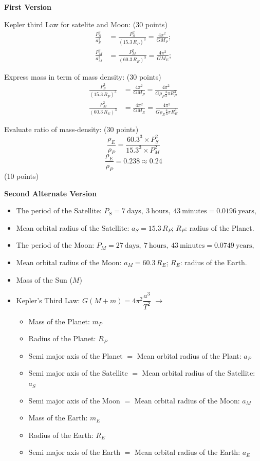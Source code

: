 \textbf{First Version}

Kepler third Law for satelite %
and Moon: \hfill(30 points)
\begin{align*}
  \frac{P_S^2}{a_S^3} &= \frac{P_S^2}{(15.3\,R_P)^3} = \frac{4\pi^2}{GM_P}; \\
  \frac{P_M^2}{a_M^3} &= \frac{P_M^2}{(60.3\,R_E)^3} = \frac{4\pi^2}{GM_E};
\end{align*}

Express mass in term of mass density: \hfill(30 points)
\begin{align*}
  \frac{P_S^2}{(15.3\,R_P)^3} &= \frac{4\pi^2}{GM_P}
    = \frac{4\pi^2}{G\rho_P \frac{4}{3}\pi R_P^3} \\
  \frac{P_M^2}{(60.3\,R_E)^3} &= \frac{4\pi^2}{GM_E}
    = \frac{4\pi^2}{G\rho_E \frac{4}{3}\pi R_E^3}
\end{align*}

Evaluate ratio of mass-density: \hfill(30 points)
\[ \frac{\rho_E}{\rho_P}
   = \frac{60.3^3 \times P_S^2}{15.3^3 \times P_M^2} \]
\[ \frac{\rho_E}{\rho_P} = 0.238 \approx 0.24 \]
\hfill(10 points)

\textbf{Second Alternate Version}

\begin{itemize}
\item The period of the Satellite:
  $P_S = 7\ \text{days},\ 3\ \text{hours},\ 43\ \text{minutes}
   = 0.0196\ \text{years}$,
\item Mean orbital radius of the Satellite: $a_S = 15.3\,R_P$; $R_P$: radius
  of the Planet.
\item The period of the Moon:
  $P_M = 27\ \text{days},\ 7\ \text{hours},\ 43\ \text{minutes}
   = 0.0749\ \text{years}$,
\item Mean orbital radius of the Moon: $a_M = 60.3\,R_E$; $R_E$: radius of
  the Earth.
\item Mass of the Sun ($M$)
\item Kepler's Third Law: $G(M + m) = 4\pi^2 \dfrac{a^3}{T^2}$
  $\rightarrow$
  \begin{itemize}
  \item Mass of the Planet: $m_P$
  \item Radius of the Planet: $R_P$
  \item Semi major axis of the Planet $=$ Mean orbital radius of the
    Plant: %
    $a_P$
  \item Semi major axis of the Satellite $=$ Mean orbital radius of the
    Satellite: $a_S$
  \item Semi major axis of the Moon $=$ Mean orbital radius of the Moon:
    $a_M$
  \item Mass of the Earth: $m_E$
  \item Radius of the Earth: $R_E$
  \item Semi major axis of the Earth $=$ Mean orbital radius of the Earth:
    $a_E$
  \end{itemize}
\end{itemize}

